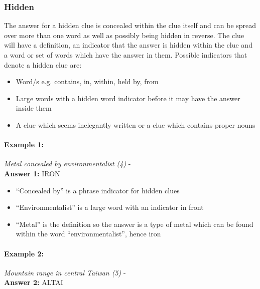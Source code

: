 \subsubsection{Hidden}  

The answer for a hidden clue is concealed within the clue itself and can be
spread over more than one word as well as possibly being hidden in reverse. The
clue will have a definition, an indicator that the answer is hidden within the
clue and a word or set of words which have the answer in them. Possible 
indicators that denote a hidden clue are:

\begin{itemize} 
    \item Word/s e.g. contains, in, within, held by, from 
    \item Large words with a hidden word indicator before it may have the 
    answer inside them 
    \item A clue which seems inelegantly written or a clue which contains 
    proper nouns  
\end{itemize}

\paragraph{Example 1:} \emph{Metal concealed by environmentalist (4)} - \citep{shuchiHidden08} \\
\textbf{Answer 1:} IRON 

\begin{itemize}
    \item ``Concealed by'' is a phrase indicator for hidden clues 
    \item ``Environmentalist'' is a large word with an indicator in front 
    \item ``Metal'' is the definition so the answer is a type of metal which 
    can be found within the word ``environmentalist'', hence iron 
\end{itemize}


\paragraph{Example 2:} \emph{Mountain range in central Taiwan (5)} - \citep{shuchiHidden08} \\
\textbf{Answer 2:} ALTAI 

